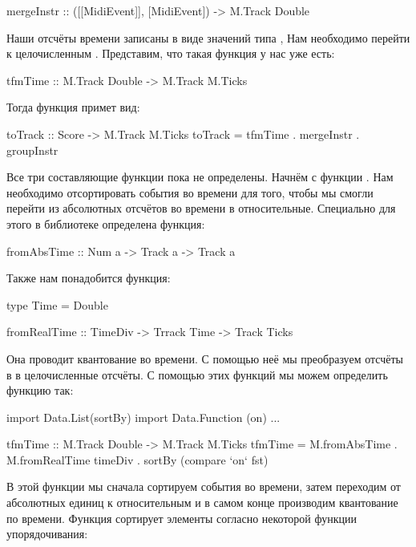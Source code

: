 \begin{code}
mergeInstr :: ([[MidiEvent]], [MidiEvent]) -> M.Track Double
\end{code}

Наши отсчёты времени записаны в виде значений типа , Нам
необходимо перейти к целочисленным . Представим, что такая
функция у нас уже есть:


\begin{code}
tfmTime :: M.Track Double -> M.Track M.Ticks
\end{code}

Тогда функция  примет вид:


\begin{code}
toTrack :: Score -> M.Track M.Ticks
toTrack = tfmTime . mergeInstr . groupInstr
\end{code}

Все три составляющие функции пока не определены. Начнём с функции
. Нам необходимо отсортировать события во времени для того,
чтобы мы смогли перейти из абсолютных отсчётов во времени в
относительные. Специально для этого в библиотеке  определена
функция:


\begin{code}
fromAbsTime :: Num a -> Track a -> Track a
\end{code}

Также нам понадобится функция:


\begin{code}
type Time = Double

fromRealTime :: TimeDiv -> Trrack Time -> Track Ticks
\end{code}

Она проводит квантование во времени. С помощью неё мы преобразуем
отсчёты в  в целочисленные отсчёты. С помощью этих функций мы
можем определить функцию  так:


\begin{code}
import Data.List(sortBy)
import Data.Function (on)
...

tfmTime :: M.Track Double -> M.Track M.Ticks
tfmTime = M.fromAbsTime . M.fromRealTime timeDiv . 
    sortBy (compare `on` fst)
\end{code}

В этой функции мы сначала сортируем события во времени, затем переходим
от абсолютных единиц к относительным и в самом конце производим
квантование по времени. Функция  сортирует элементы согласно
некоторой функции упорядочивания:


